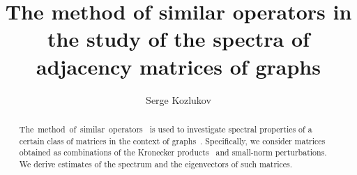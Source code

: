 \documentclass[a4paper]{jpconf}
\begin{document}
\title{The method of similar operators in the study of the spectra of adjacency matrices of graphs}

\author{Serge Kozlukov}

\address{\emph{Voronezh State University}, 1 Universitetskaya Ploshad', Voronezh, RU 394036}


\begin{abstract}
    The~method~of~similar~operators~\cite{baskakov1983methods,baskakov2014memory,baskakov2017method,baskakov2013completeness}
        is used to investigate spectral properties
        of a certain class of matrices in the context of graphs~\cite{van2003graphs,cvetkovic1980spectra}.
    Specifically, we consider matrices
        obtained as combinations
        of the Kronecker products~\cite{bellman-matrices-kron,XIANG2005210}
        and small-norm perturbations.
    We derive estimates
        of the spectrum and the eigenvectors
        of such matrices.
\end{abstract}
\end{document}
